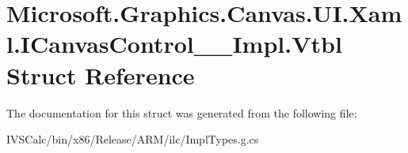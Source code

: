 \hypertarget{struct_microsoft_1_1_graphics_1_1_canvas_1_1_u_i_1_1_xaml_1_1_i_canvas_control_____impl_1_1_vtbl}{}\section{Microsoft.\+Graphics.\+Canvas.\+U\+I.\+Xaml.\+I\+Canvas\+Control\+\_\+\+\_\+\+Impl.\+Vtbl Struct Reference}
\label{struct_microsoft_1_1_graphics_1_1_canvas_1_1_u_i_1_1_xaml_1_1_i_canvas_control_____impl_1_1_vtbl}


The documentation for this struct was generated from the following file\+:\begin{DoxyCompactItemize}
\item 
I\+V\+S\+Calc/bin/x86/\+Release/\+A\+R\+M/ilc/Impl\+Types.\+g.\+cs\end{DoxyCompactItemize}
